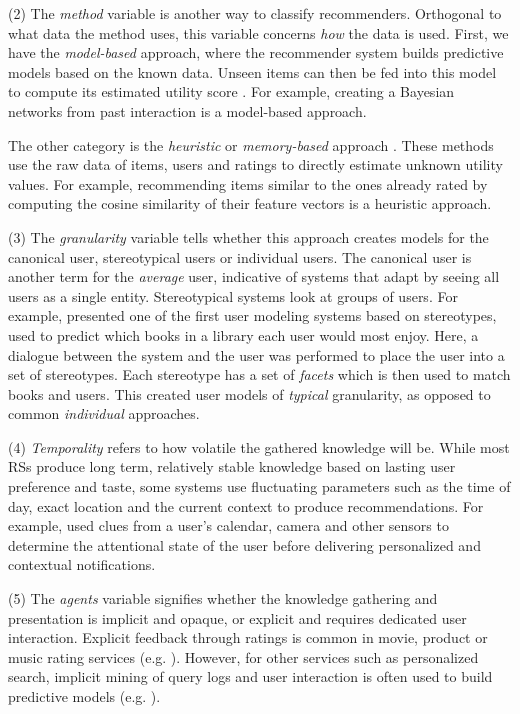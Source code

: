 (2) The \emph{method} variable is another way to classify recommenders. Orthogonal to what data the method uses, this variable
concerns \emph{how} the data is used.
First, we have the \emph{model-based} approach, where the recommender system builds predictive models based on the known data. 
Unseen items can then be fed into this model to compute its estimated utility score
\cite[p5]{Adomavicius2005}. 
For example, creating a Bayesian networks from past interaction is a model-based approach.

The other category is the \emph{heuristic} or \emph{memory-based} approach \cite[p5]{Adomavicius2005}. 
These methods use the raw data of items, users and ratings to directly estimate unknown utility values. 
For example, recommending items similar to the ones already rated by computing the cosine similarity of their feature vectors is a heuristic approach.

(3) The \emph{granularity} variable tells whether this approach creates models for the canonical user, stereotypical users or individual users. 
The canonical user is another term for the \emph{average} user, indicative of systems that adapt by seeing all users as a single entity. 
Stereotypical systems look at groups of users. 
For example, \cite{Rich1979} presented one of the first user modeling systems based on stereotypes, 
used to predict which books in a library each user would most enjoy.
Here, a dialogue between the system and the user was performed to place the user into a set of stereotypes. 
Each stereotype has a set of \emph{facets} which is then used to match books and users.
This created user models of \emph{typical} granularity, as opposed to common \emph{individual} approaches.

(4) \emph{Temporality} refers to how volatile the gathered knowledge will be.
While most RSs produce long term, relatively stable knowledge based on lasting user preference and taste, 
some systems use fluctuating parameters such as the time of day, exact location and the current context to produce recommendations.
For example, \cite{Horvitz} used clues from a user's calendar, camera and other sensors to determine the attentional state
of the user before delivering personalized and contextual notifications.

(5) The \emph{agents} variable signifies whether the knowledge gathering and presentation is implicit and opaque, 
or explicit and requires dedicated user interaction. Explicit feedback through ratings is 
common in movie, product or music rating services (e.g. \cite{Bell2007, Basu1998, Hotho}). 
However, for other services such as personalized search,
implicit mining of query logs and user interaction is often used to build predictive models 
(e.g. \cite{Shen2005, Agichtein2006, Speretta2000, Teevan2005}).



